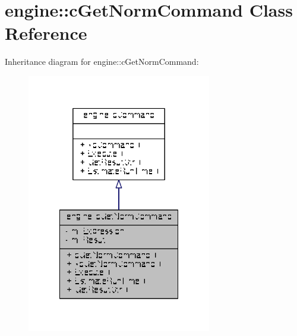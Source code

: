 \hypertarget{classengine_1_1cGetNormCommand}{\section{engine\-:\-:c\-Get\-Norm\-Command Class Reference}
\label{classengine_1_1cGetNormCommand}
}


Inheritance diagram for engine\-:\-:c\-Get\-Norm\-Command\-:
\nopagebreak
\begin{figure}[H]
\begin{center}
\leavevmode
\includegraphics[width=228pt]{classengine_1_1cGetNormCommand__inherit__graph}
\end{center}
\end{figure}


